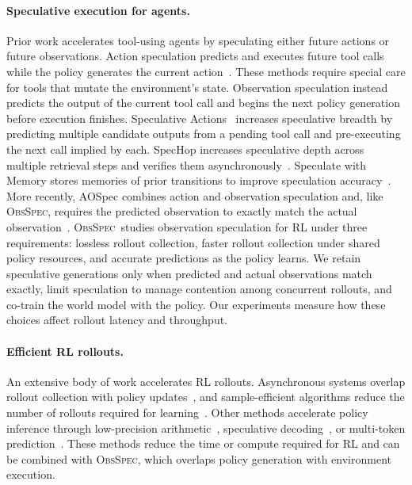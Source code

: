 \documentclass{article} %
\newcommand{\method}{\textsc{ObsSpec}}
\begin{document}
\paragraph{Speculative execution for agents.}
Prior work accelerates tool-using agents by speculating either future actions or future observations. Action speculation predicts and executes future tool calls while the policy generates the current action~\citep{sui2026paste,nichols2025optimizing,bai2026spork,huang2025reducing,zhong2026dualspec,liu2026speculative}. These methods require special care for tools that mutate the environment's state. Observation speculation instead predicts the output of the current tool call and begins the next policy generation before execution finishes. Speculative Actions~\citep{ye2025speculative} increases speculative breadth by predicting multiple candidate outputs from a pending tool call and pre-executing the next call implied by each. SpecHop increases speculative depth across multiple retrieval steps and verifies them asynchronously~\citep{saberi2026spechop}. Speculate with Memory stores memories of prior transitions to improve speculation accuracy~\citep{li2026speculate}. More recently, AOSpec combines action and observation speculation and, like \method, requires the predicted observation to exactly match the actual observation~\citep{chen2026aospec}. \method\ studies observation speculation for RL under three requirements: lossless rollout collection, faster rollout collection under shared policy resources, and accurate predictions as the policy learns. We retain speculative generations only when predicted and actual observations match exactly, limit speculation to manage contention among concurrent rollouts, and co-train the world model with the policy. Our experiments measure how these choices affect rollout latency and throughput.

\paragraph{Efficient RL rollouts.}
An extensive body of work accelerates RL rollouts. Asynchronous systems overlap rollout collection with policy updates~\citep{fu2026areal,piche2025pipelinerl}, and sample-efficient algorithms reduce the number of rollouts required for learning~\citep{chen2025minimax,gao2025soft,shrivastava2026echo}. Other methods accelerate policy inference through low-precision arithmetic~\citep{xiao2023smoothquant,qiu2026fp8}, speculative decoding~\citep{leviathan2023fast,chen2026respec,zhang2026fastgrpo,he2025history,shao2026beat,chang2026srt,liu2025spec,pham2026specroll}, or multi-token prediction~\citep{gloeckle2024better,wang2026mtp}. These methods reduce the time or compute required for RL and can be combined with \method, which overlaps policy generation with environment execution.
\end{document}
